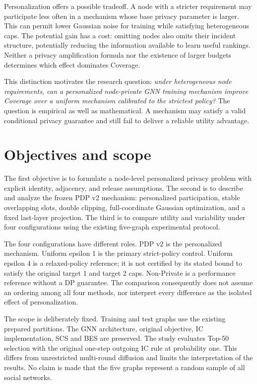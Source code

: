 Personalization offers a possible tradeoff. A node with a stricter requirement may participate less often in a mechanism whose base privacy parameter is larger. This can permit lower Gaussian noise for training while satisfying heterogeneous caps. The potential gain has a cost: omitting nodes also omits their incident structure, potentially reducing the information available to learn useful rankings. Neither a privacy amplification formula nor the existence of larger budgets determines which effect dominates Coverage.

This distinction motivates the research question: \emph{under heterogeneous node requirements, can a personalized node-private GNN training mechanism improve Coverage over a uniform mechanism calibrated to the strictest policy?} The question is empirical as well as mathematical. A mechanism may satisfy a valid conditional privacy guarantee and still fail to deliver a reliable utility advantage.

\section{Objectives and scope}
The first objective is to formulate a node-level personalized privacy problem with explicit identity, adjacency, and release assumptions. The second is to describe and analyze the frozen PDP v2 mechanism: personalized participation, stable overlapping slots, double clipping, full-coordinate Gaussian optimization, and a fixed last-layer projection. The third is to compare utility and variability under four configurations using the existing five-graph experimental protocol.

The four configurations have different roles. PDP v2 is the personalized mechanism. Uniform epsilon 1 is the primary strict-policy control. Uniform epsilon 4 is a relaxed-policy reference; it is not certified by its stated bound to satisfy the original target 1 and target 2 caps. Non-Private is a performance reference without a DP guarantee. The comparison consequently does not assume an ordering among all four methods, nor interpret every difference as the isolated effect of personalization.

The scope is deliberately fixed. Training and test graphs use the existing prepared partitions. The GNN architecture, original objective, IC implementation, SCS and BES are preserved. The study evaluates Top-50 selection with the original one-step outgoing IC rule at probability one. This differs from unrestricted multi-round diffusion and limits the interpretation of the results. No claim is made that the five graphs represent a random sample of all social networks.

